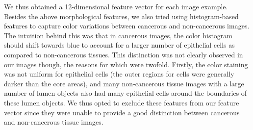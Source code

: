We thus obtained a 12-dimensional feature vector for each image example. Besides the above morphological features, we also tried using histogram-based features to capture color variations between cancerous and non-cancerous images. The intuition behind this was that in cancerous images, the color histogram should shift towards blue to account for a larger number of epithelial cells as compared to non-cancerous tissues. This distinction was not clearly observed in our images though, the reasons for which were twofold. Firstly, the color staining was not uniform for epithelial cells (the outer regions for cells were generally darker than the core areas), and many non-cancerous tissue images with a large number of lumen objects also had many epithelial cells around the boundaries of these lumen objects. We thus opted to exclude these features from our feature vector since they were unable to provide a good distinction between cancerous and non-cancerous tissue images.

\label{sec:image_based_approaches}